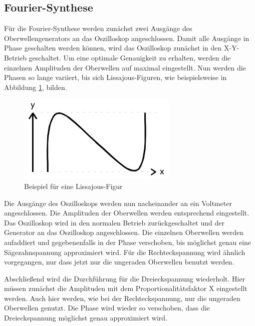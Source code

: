 \subsection{Fourier-Synthese}
Für die Fourier-Synthese werden zunächst zwei Ausgänge des Oberwellengenerators
an das Oszilloskop angeschlossen. Damit alle Ausgänge in Phase geschalten werden
können, wird das Oszilloskop zunächst in den X-Y-Betrieb geschaltet. Um eine
optimale Genauigkeit zu erhalten, werden die einzelnen Amplituden der Oberwellen
auf maximal eingestellt. Nun werden die Phasen so lange variiert, bis sich
Lissajous-Figuren, wie beispielsweise in Abbildung \ref{lissa}, bilden.
\begin{figure}[H]
  \centering
  \includegraphics{bilder/lissajous.jpg}
  \caption{Beispiel für eine Lissajous-Figur}
  \label{lissa}
\end{figure}
Die Ausgänge des Oszilloskops werden nun nacheinander an ein Voltmeter
angeschlossen. Die Amplituden der Oberwellen werden entsprechend eingestellt.
Das Oszilloskop wird in den normalen Betrieb zurückgeschaltet und der Generator
an das Oszilloskop angeschlossen. Die einzelnen Oberwellen werden aufaddiert und
gegebenenfalls in der Phase verschoben, bis möglichst genau eine Sägezahnspannung
approximiert wird.
Für die Rechteckspannung wird ähnlich vorgegangen, nur dass jetzt nur die
ungeraden Oberwellen benutzt werden.

Abschließend wird die Durchführung für die Dreieckspannung wiederholt. Hier müssen
zunächst die Amplituden mit dem Proportionalitätsfaktor X eingestellt werden.
Auch hier werden, wie bei der Rechteckspannung, nur die ungeraden Oberwellen
genutzt. Die Phase wird wieder so verschoben, dass die Dreieckspannung möglichst
genau approximiert wird.
